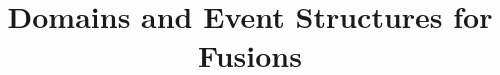 %
\newcommand{\perm}{\sigma}

\newcommand\twoheaddownarrow{\mathrel{\raisebox{0.8\depth}{\rotatebox{270}{$\twoheadrightarrow$}}}}
\newcommand{\scauses}[1]{\ensuremath{\twoheaddownarrow\!\!{#1}\,}}
\newcommand{\causes}[1]{\ensuremath{\,\downarrow\!\!{#1}}}

\newcommand{\sat}[1]{\ensuremath{\tilde{#1}}}




\newcommand{\Abs}[1]{\ensuremath{\mathsf{Abs}({#1})}}
\newcommand{\tr}[1]{\ensuremath{\mathsf{Tr}({#1})}}
%
\newcommand{\trs}[1]{\ensuremath{\mathsf{Tr}_s({#1})}}
\newcommand{\graph}{\ensuremath{\mathsf{Graph}}}
\newcommand{\tgraph}[1]{\ensuremath{\mathsf{Graph}_{#1}}}
\newcommand{\can}[1]{\ensuremath{\mathsf{C}({#1})}}
%
\newcommand{\source}[1]{\ensuremath{\mathsf{s}({#1})}}
\newcommand{\target}[1]{\ensuremath{\mathsf{t}({#1})}}
\newcommand{\col}[1]{\ensuremath{\mathsf{col}({#1})}}

%
\newcommand{\ltrace}[1]{\ensuremath{\langle {#1}\rangle_c}}

\title{Domains and Event Structures for Fusions}
\author{}




\maketitle


